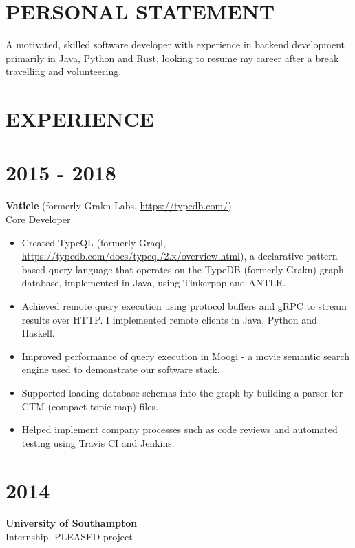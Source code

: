 \documentclass[margin]{res}
\begin{document}
\begin{resume}

\section{PERSONAL STATEMENT}

A motivated, skilled software developer with experience in backend development primarily in Java, Python and Rust, looking to resume my career after a break travelling and volunteering.

\section{EXPERIENCE}

\normalsize{\section{2015 - 2018}}
{\bf Vaticle} (formerly Grakn Labs, \href{https://typedb.com/}{https://typedb.com/}) \\
Core Developer
\begin{itemize}

\item
Created TypeQL (formerly Graql, \href{https://typedb.com/docs/typeql/2.x/overview.html}{https://typedb.com/docs/typeql/2.x/overview.html}), a declarative pattern-based query language that operates on the TypeDB (formerly Grakn) graph database, implemented in Java, using Tinkerpop and ANTLR.

\item
Achieved remote query execution using protocol buffers and gRPC to stream results over HTTP. I implemented remote clients in Java, Python and Haskell.

\item
Improved performance of query execution in Moogi - a movie semantic search engine used to demonstrate our software stack.

\item
Supported loading database schemas into the graph by building a parser for CTM (compact topic map) files.

\item
Helped implement company processes such as code reviews and automated testing using Travis CI and Jenkins.

\end{itemize}

\normalsize{\section{2014}}
{\bf University of Southampton} \\
Internship, PLEASED project


\end{resume}
\end{document}
